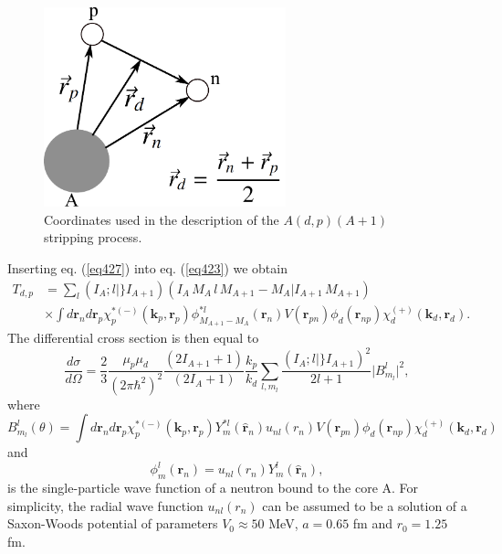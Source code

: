  \begin{figure}
\centerline{\includegraphics*[width=7cm,angle=0]{C6/figs_C6/fig6_E1}}
\caption{Coordinates used in the description of the $A (d,p)(A+1)$ stripping process.}\label{fig6_E1}
\end{figure}

Inserting eq. (\ref{eq427}) into eq. (\ref{eq423}) we obtain
 \begin{equation}\label{eq428}
 \begin{split}
T_{d,p}&= \sum_l (I_A;l \vert \} I_{A+1}) (I_A\, M_A\, l\, M_{A+1}-M_A \vert I_{A+1}\,M_{A+1})  \\
&\times\int d\mathbf r_n d \mathbf r_p \chi^{* (-)}_p(\mathbf k_p,\mathbf r_p) \phi_{M_{A+1}-M_A}^{*l}(\mathbf r_n)
V(\mathbf r_{pn}) \phi_d(\mathbf r_{np})
\chi^{(+)}_d(\mathbf k_d,\mathbf r_d).
\end{split}
\end{equation}
The differential cross section is then equal to
\begin{equation}\label{eq429}
\frac{d \sigma}{d \Omega} = \frac{2}{3} \frac{\mu_p \mu_d}{(2\pi \hbar^2)^2}\frac{(2I_{A+1}+1)}{(2I_A+1)}
\frac{k_p}{k_d}\sum_{l,m_l}\frac{(I_A;l \vert \} I_{A+1})^2}{2l+1} \vert B_{m_l}^l\vert ^2,
\end{equation}
where
\begin{equation}\label{eq430}
B_{m_l}^l(\theta)=\int d\mathbf r_n d \mathbf r_p \chi^{* (-)}_p(\mathbf k_p,\mathbf r_p) Y_m^{*l}(\hat {\mathbf r}_n) u_{nl}(r_n)
V(\mathbf r_{pn}) \phi_d(\mathbf r_{np})
\chi^{(+)}_d(\mathbf k_d,\mathbf r_d)
\end{equation}
and
\begin{equation}\label{eqC6E10}
\phi_m^{l}(\mathbf r_n)=u_{nl}(r_n) Y_m^{l}(\hat {\mathbf r}_n),
\end{equation}
is the single-particle wave function of a neutron bound to  the core A. For simplicity, the radial wave function $u_{nl}(r_n)$ can be assumed to be a solution of a Saxon-Woods potential of parameters $V_0\approx 50$ MeV, $a=0.65$ fm and $r_0=1.25$ fm.




